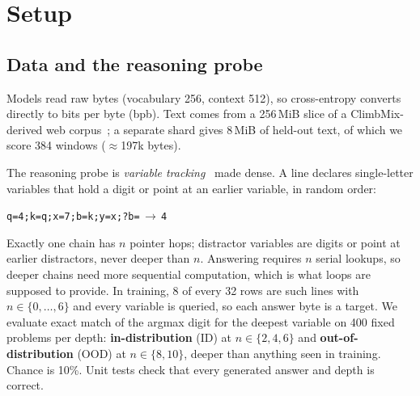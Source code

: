 \section{Setup}\label{sec:setup}

\subsection{Data and the reasoning probe}
Models read raw bytes (vocabulary 256, context 512), so cross-entropy converts directly to bits per byte
(bpb). Text comes from a 256\,MiB slice of a ClimbMix-derived web corpus~\citep{diao2025climb}; a
separate shard gives 8\,MiB of held-out text, of which we score 384 windows ($\approx$197k bytes).

The reasoning probe is \emph{variable tracking}~\citep{hsieh2024ruler} made dense. A line declares
single-letter variables that hold a digit or point at an earlier variable, in random order:
\begin{center}\texttt{q=4;k=q;x=7;b=k;y=x;?b=}\,$\rightarrow$\,\texttt{4}\end{center}
Exactly one chain has $n$ pointer hops; distractor variables are digits or point at earlier
distractors, never deeper than $n$. Answering requires $n$ serial lookups, so deeper chains need more
sequential computation, which is what loops are supposed to provide. In training, 8 of every 32 rows are
such lines with $n\in\{0,\dots,6\}$ and every variable is queried, so each answer byte is a target. We
evaluate exact match of the argmax digit for the deepest variable on 400 fixed problems per depth:
\textbf{in-distribution} (ID) at $n\in\{2,4,6\}$ and \textbf{out-of-distribution} (OOD) at
$n\in\{8,10\}$, deeper than anything seen in training. Chance is 10\%. Unit tests check that every
generated answer and depth is correct.

